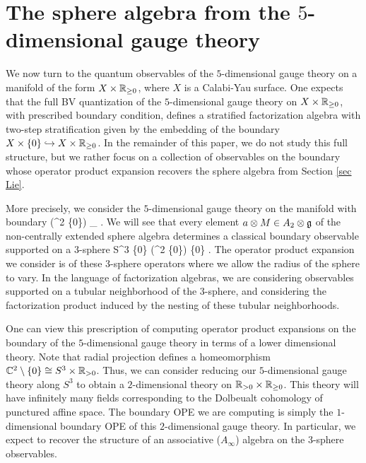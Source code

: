 \section{The sphere algebra from the $5$-dimensional gauge theory}

We now turn to the quantum observables of the $5$-dimensional gauge theory on a manifold of the form $X\times \mathbb R_{\geq 0}$, where $X$ is a Calabi-Yau surface.
One expects that the full BV quantization of the $5$-dimensional gauge theory on $X \times \mathbb R_{\geq 0}$, with prescribed boundary condition, defines a stratified factorization algebra with two-step stratification given by the embedding of the boundary $X \times \{0\} \hookrightarrow X \times \mathbb R_{\geq 0}$.
In the remainder of this paper, we do not study this full structure, but we rather focus on a collection of observables on the boundary whose operator product expansion recovers the sphere algebra from Section \ref{sec Lie}.

More precisely, we consider the $5$-dimensional gauge theory on the manifold with boundary 
\ben
\left(\CC^2 \setminus \{0\}\right) \times \RR_{} .
\een
We will see that every element $a \otimes M \in A_2 \otimes \mathfrak g$ of the non-centrally extended sphere algebra determines a classical boundary observable supported on a $3$-sphere 
\ben
S^3 \times \{0\} \subset \left(\CC^2 \setminus \{0\}\right) \times \{0\} .
\een
The operator product expansion we consider is of these $3$-sphere operators where we allow the radius of the sphere to vary. 
In the language of factorization algebras, we are considering observables supported on a tubular neighborhood of the $3$-sphere, and considering the factorization product induced by the nesting of these tubular neighborhoods. 

One can view this prescription of computing operator product expansions on the boundary of the $5$-dimensional gauge theory in terms of a lower dimensional theory. 
Note that radial projection defines a homeomorphism $\mathbb C^2 \setminus \{0\} \cong S^3 \times \mathbb R_{>0}$. 
Thus, we can consider reducing our $5$-dimensional gauge theory along $S^3$ to obtain a $2$-dimensional theory on $\mathbb R_{>0} \times \mathbb R_{\geq 0}$. 
This theory will have infinitely many fields corresponding to the Dolbeualt cohomology of punctured affine space. 
The boundary OPE we are computing is simply the $1$-dimensional boundary OPE of this $2$-dimensional gauge theory. 
In particular, we expect to recover the structure of an associative ($A_\infty$) algebra on the $3$-sphere observables. 

